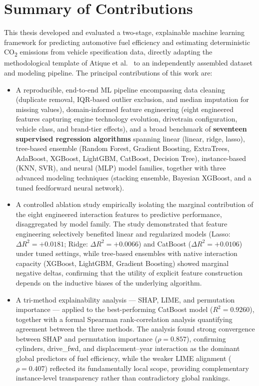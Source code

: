 \section{Summary of Contributions}

This thesis developed and evaluated a two-stage, explainable machine learning framework for predicting automotive fuel efficiency and estimating deterministic CO\textsubscript{2} emissions from vehicle specification data, directly adapting the methodological template of Atique et al.~\cite{atique2026explainable} to an independently assembled dataset and modeling pipeline. The principal contributions of this work are:

\begin{itemize}
    \item A reproducible, end-to-end ML pipeline encompassing data cleaning (duplicate removal, IQR-based outlier exclusion, and median imputation for missing values), domain-informed feature engineering (eight engineered features capturing engine technology evolution, drivetrain configuration, vehicle class, and brand-tier effects), and a broad benchmark of \textbf{seventeen supervised regression algorithms} spanning linear (linear, ridge, lasso), tree-based ensemble (Random Forest, Gradient Boosting, ExtraTrees, AdaBoost, XGBoost, LightGBM, CatBoost, Decision Tree), instance-based (KNN, SVR), and neural (MLP) model families, together with three advanced modeling techniques (stacking ensemble, Bayesian XGBoost, and a tuned feedforward neural network).

    \item A controlled ablation study empirically isolating the marginal contribution of the eight engineered interaction features to predictive performance, disaggregated by model family. The study demonstrated that feature engineering selectively benefited linear and regularized models (Lasso: \(\Delta R^2 = +0.0181\); Ridge: \(\Delta R^2 = +0.0066\)) and CatBoost (\(\Delta R^2 = +0.0106\)) under tuned settings, while tree-based ensembles with native interaction capacity (XGBoost, LightGBM, Gradient Boosting) showed marginal negative deltas, confirming that the utility of explicit feature construction depends on the inductive biases of the underlying algorithm.

    \item A tri-method explainability analysis --- SHAP, LIME, and permutation importance --- applied to the best-performing CatBoost model (\(R^2 = 0.9260\)), together with a formal Spearman rank-correlation analysis quantifying agreement between the three methods. The analysis found strong convergence between SHAP and permutation importance (\(\rho = 0.857\)), confirming cylinders, drive\_fwd, and displacement--year interaction as the dominant global predictors of fuel efficiency, while the weaker LIME alignment (\(\rho = 0.407\)) reflected its fundamentally local scope, providing complementary instance-level transparency rather than contradictory global rankings.


\end{itemize}
